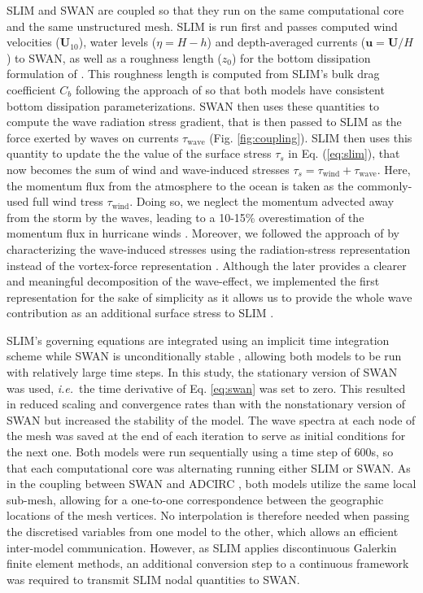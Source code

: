 \documentclass[preprint,12pt,authoryear]{elsarticle}
\newcommand{\ie}{{\it i.e.}\ }
\begin{document}
SLIM and SWAN are coupled so that they run on the same computational core and the same unstructured mesh. SLIM is run first and passes computed wind velocities ($\mathbf{U}_{10}$), water levels ($\eta=H-h$) and depth-averaged currents ($\mathbf{u}=\mathbf{U}/H$) to SWAN, as well as a roughness length ($z_0$) for the bottom dissipation formulation of \cite{madsen1989spectral}. This roughness length is computed from SLIM's bulk drag coefficient $C_b$ following the approach of \cite{dietrich2011hurricane} so that both models have consistent bottom dissipation parameterizations. SWAN then uses these quantities to compute the wave radiation stress gradient, that is then passed to SLIM as the force exerted by waves on currents {\boldmath$\tau$}$_\text{wave}$ (Fig. \ref{fig:coupling}). SLIM then uses this quantity to update the the value of the surface stress {\boldmath$\tau$}$_s$ in Eq. (\ref{eq:slim}), that now becomes the sum of wind and wave-induced stresses {\boldmath$\tau$}$_s=${\boldmath$\tau$}$_\text{wind}+${\boldmath$\tau$}$_\text{wave}$. Here, the momentum flux from the atmosphere to the ocean is taken as the commonly-used full wind tress {\boldmath$\tau$}$_\text{wind}$. Doing so, we neglect the momentum advected away from the storm by the waves, leading to a 10-15\% overestimation of the momentum flux in hurricane winds \cite{curcic2015explicit}. Moreover, we followed the approach of \cite{dietrich2012performance} by characterizing the wave-induced stresses using the radiation-stress representation instead of the vortex-force representation \citep{mcwilliams2004asymptotic}. Although the later provides a clearer and meaningful decomposition of the wave-effect, we implemented the first representation for the sake of simplicity as it allows us to provide the whole wave contribution as an additional surface stress to SLIM \citep{lane2007wave}.

SLIM's governing equations are integrated using an implicit time integration scheme while SWAN is unconditionally stable \citep{dietrich2012performance}, allowing both models to be run with relatively large time steps. In this study, the stationary version of SWAN was used, \ie the time derivative of Eq. \ref{eq:swan} was set to zero. This resulted in reduced scaling and convergence rates than with the nonstationary version of SWAN but increased the stability of the model. The wave spectra at each node of the mesh was saved at the end of each iteration to serve as initial conditions for the next one. Both models were run sequentially using a time step of 600s, so that each computational core was alternating running either SLIM or SWAN. As in the coupling between SWAN and ADCIRC \citep{dietrich2012performance}, both models utilize the same local sub-mesh, allowing for a one-to-one correspondence between the geographic locations of the mesh vertices. No interpolation is therefore needed when passing the discretised variables from one model to the other, which allows an efficient inter-model communication. However, as SLIM applies discontinuous Galerkin finite element methods, an additional conversion step to a continuous framework was required to transmit SLIM nodal quantities to SWAN.  
\end{document}
